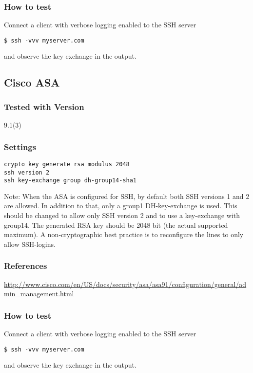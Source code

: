 \subsubsection{How to test}
Connect a client with verbose logging enabled to the SSH server \\
\begin{lstlisting}[breaklines]
$ ssh -vvv myserver.com
\end{lstlisting}and observe the key exchange in the output.


\subsection{Cisco ASA}
\subsubsection{Tested with Version} 9.1(3)
\subsubsection{Settings}
\begin{lstlisting}[breaklines]
crypto key generate rsa modulus 2048
ssh version 2
ssh key-exchange group dh-group14-sha1
\end{lstlisting}
Note: When the ASA is configured for SSH, by default both SSH versions 1 and 2 are allowed. In addition to that, only a group1 DH-key-exchange is used. This should be changed to allow only SSH version 2 and to use a key-exchange with group14. The generated RSA key should be 2048 bit (the actual supported maximum). A non-cryptographic best practice is to reconfigure the lines to only allow SSH-logins.
\subsubsection{References}
\url{http://www.cisco.com/en/US/docs/security/asa/asa91/configuration/general/admin\_management.html }
\subsubsection{How to test}
Connect a client with verbose logging enabled to the SSH server \\
\begin{lstlisting}[breaklines]
$ ssh -vvv myserver.com
\end{lstlisting}and observe the key exchange in the output.


